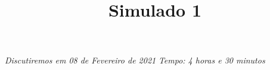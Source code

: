 \documentclass[12pt,a4paper]{article}
\title{Simulado 1}
\author{\vspace{1.3ex}}
\begin{document}
	
	\zeustitle

	\textit{Discutiremos em 08 de Fevereiro de 2021} \hfill \textit{Tempo: 4 horas e 30 minutos}

	\vspace{1em}

\end{document}
